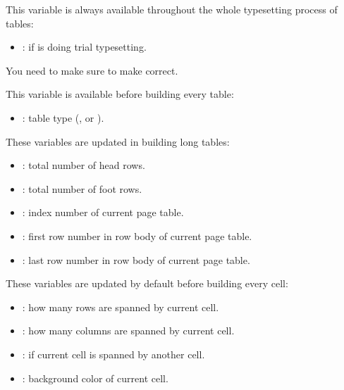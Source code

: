 \documentclass[oneside]{book}
\begin{document}
{This variable is always available throughout the whole typesetting process of tables:
\begin{itemize}[nosep]
  \item \CC{\lTblrMeasuringBool}: if  is doing trial typesetting.
\end{itemize}
You need to make sure  to make \CC{\lTblrMeasuringBool} correct.

This variable is available before building every table:
\begin{itemize}[nosep]
  \item \CC{\lTblrPortraitTypeTl}: table type (,  or ).
\end{itemize}

These variables are updated in building long tables:
\begin{itemize}[nosep]
  \item \CC{\lTblrRowHeadInt}: total number of head rows.
  \item \CC{\lTblrRowFootInt}: total number of foot rows.
  \item \CC{\lTblrTablePageInt}: index number of current page table.
  \item \CC{\lTblrRowFirstInt}: first row number in row body of current page table.
  \item \CC{\lTblrRowLastInt}: last row number in row body of current page table.
\end{itemize}

These variables are updated by default before building every cell:
\begin{itemize}[nosep]
  \item \CC{\lTblrCellRowSpanInt}: how many rows are spanned by current cell.
  \item \CC{\lTblrCellColSpanInt}: how many columns are spanned by current cell.
  \item \CC{\lTblrCellOmittedBool}: if current cell is spanned by another cell.
  \item \CC{\lTblrCellBackgroundTl}: background color of current cell.
\end{itemize}

}
\end{document}
